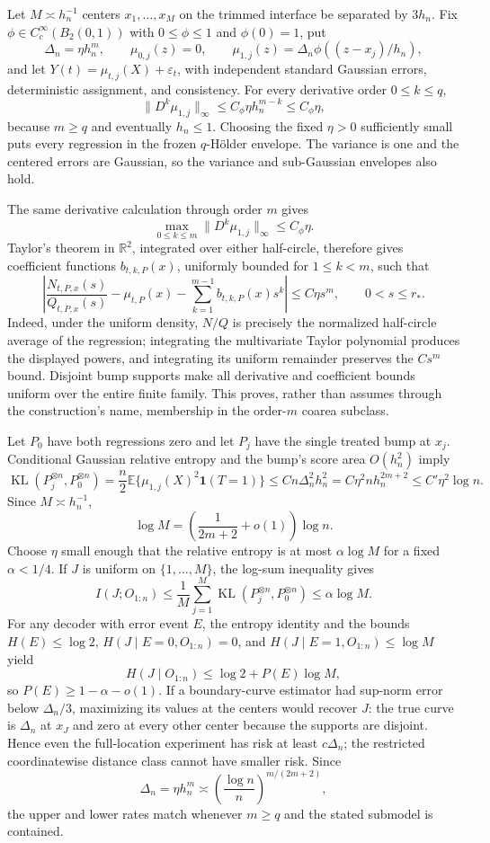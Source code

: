 Let \(M\asymp h_n^{-1}\) centers \(x_1,\ldots,x_M\) on the trimmed interface be separated by \(3h_n\).  Fix \(\phi\in C_c^\infty(B_2(0,1))\) with \(0\leq\phi\leq1\) and \(\phi(0)=1\), put
\[
 \Delta_n=\eta h_n^m,
 \qquad
 \mu_{0,j}(z)=0,
 \qquad
 \mu_{1,j}(z)=\Delta_n\phi((z-x_j)/h_n),
\]
and let \(Y(t)=\mu_{t,j}(X)+\varepsilon_t\), with independent standard Gaussian errors, deterministic assignment, and consistency.  For every derivative order \(0\leq k\leq q\),
\[
 \|D^k\mu_{1,j}\|_\infty
 \leq C_\phi\eta h_n^{m-k}
 \leq C_\phi\eta,
\]
because \(m\geq q\) and eventually \(h_n\leq1\).  Choosing the fixed \(\eta>0\) sufficiently small puts every regression in the frozen \(q\)-H\"older envelope.  The variance is one and the centered errors are Gaussian, so the variance and sub-Gaussian envelopes also hold.

The same derivative calculation through order \(m\) gives
\[
 \max_{0\leq k\leq m}\|D^k\mu_{1,j}\|_\infty\leq C_\phi\eta.
\]
Taylor's theorem in \(\mathbb R^2\), integrated over either half-circle, therefore gives coefficient functions \(b_{t,k,P}(x)\), uniformly bounded for \(1\leq k<m\), such that
\[
 \left|\frac{N_{t,P,x}(s)}{Q_{t,P,x}(s)}-\mu_{t,P}(x)
 -\sum_{k=1}^{m-1}b_{t,k,P}(x)s^k\right|
 \leq C\eta s^m,
 \qquad 0<s\leq r_*.
\]
Indeed, under the uniform density, \(N/Q\) is precisely the normalized half-circle average of the regression; integrating the multivariate Taylor polynomial produces the displayed powers, and integrating its uniform remainder preserves the \(Cs^m\) bound.  Disjoint bump supports make all derivative and coefficient bounds uniform over the entire finite family.  This proves, rather than assumes through the construction's name, membership in the order-\(m\) coarea subclass.

Let \(P_0\) have both regressions zero and let \(P_j\) have the single treated bump at \(x_j\).  Conditional Gaussian relative entropy and the bump's score area \(O(h_n^2)\) imply
\[
 \operatorname{KL}(P_j^{\otimes n},P_0^{\otimes n})
 =\frac n2\mathbb E\{\mu_{1,j}(X)^2\mathbf1(T=1)\}
 \leq Cn\Delta_n^2h_n^2
 =C\eta^2nh_n^{2m+2}
 \leq C'\eta^2\log n.
\]
Since \(M\asymp h_n^{-1}\),
\[
 \log M=\left(\frac1{2m+2}+o(1)\right)\log n.
\]
Choose \(\eta\) small enough that the relative entropy is at most \(\alpha\log M\) for a fixed \(\alpha<1/4\).  If \(J\) is uniform on \(\{1,\ldots,M\}\), the log-sum inequality gives
\[
 I(J;O_{1:n})
 \leq\frac1M\sum_{j=1}^M\operatorname{KL}(P_j^{\otimes n},P_0^{\otimes n})
 \leq\alpha\log M.
\]
For any decoder with error event \(E\), the entropy identity and the bounds \(H(E)\leq\log2\), \(H(J\mid E=0,O_{1:n})=0\), and \(H(J\mid E=1,O_{1:n})\leq\log M\) yield
\[
 H(J\mid O_{1:n})\leq\log2+P(E)\log M,
\]
so \(P(E)\geq1-\alpha-o(1)\).  If a boundary-curve estimator had sup-norm error below \(\Delta_n/3\), maximizing its values at the centers would recover \(J\): the true curve is \(\Delta_n\) at \(x_J\) and zero at every other center because the supports are disjoint.  Hence even the full-location experiment has risk at least \(c\Delta_n\); the restricted coordinatewise distance class cannot have smaller risk.  Since
\[
 \Delta_n=\eta h_n^m
 \asymp\left(\frac{\log n}{n}\right)^{m/(2m+2)},
\]
the upper and lower rates match whenever \(m\geq q\) and the stated submodel is contained.

